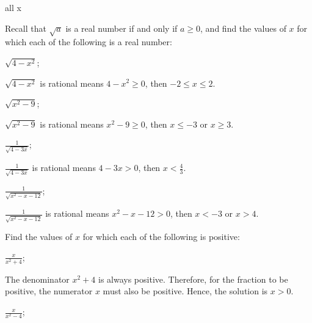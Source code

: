 \begin{questions}
\begin{solution}
\begin{tasks}
{\begin{note}
      \end{note}
      all x
      }

    \end{tasks}

  \end{solution}
  \item Recall that $\sqrt{a}$ is a real number if and only if $a \geq 0$, and find the values of $x$ for which each of the following is a real number:
  \begin{tasks}
    \task $\sqrt{4-x^2}$;

    \begin{solution}
      $\sqrt{4-x^2}$ is rational means $4-x^2 \geq 0$, then $-2 \leq x \leq 2$.
    \end{solution}

    \task $\sqrt{x^2-9}$;

    \begin{solution}
      $\sqrt{x^2-9}$ is rational means $x^2-9 \geq 0$, then $x \leq -3$ or $x \geq 3$.
    \end{solution}

    \task \(\frac{1}{\sqrt{4-3x}}\);

    \begin{solution}
      \(\frac{1}{\sqrt{4-3x}}\) is rational means $4-3x>0$, then \(x < \frac{4}{3}\).
    \end{solution}

    \task \(\frac{1}{\sqrt{x^2-x-12}}\);

    \begin{solution}
      \(\frac{1}{\sqrt{x^2-x-12}}\) is rational means $x^2-x-12>0$, then $x<-3$ or $x>4$.
    \end{solution}

  \end{tasks}

  \item Find the values of $x$ for which each of the following is positive:
  \begin{tasks}
    \task \(\frac{x}{x^2+4}\);

    \begin{solution}
      The denominator $x^2+4$ is always positive. Therefore, for the fraction to be positive, the numerator $x$ must also be positive. Hence, the solution is $x>0$.
    \end{solution}

    \task \(\frac{x}{x^2-4}\);


\end{tasks}
\end{questions}
